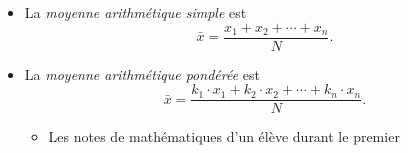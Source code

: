 \begin{defi}
\begin{itemize}
\begin{ex}
\begin{itemize}
{{\[                                                                \]
                                                                On en déduit
                                                                \[
                                                                  x=\frac{b-a}{\beta-\alpha}(y-\alpha)+a.
                                                                \]
                                                                Pour trouver $x_m$, on prend $y=m$ :
                                                                \[
                                                                  \propbox{x_m=\frac{b-a}{\beta-\alpha}(m-\alpha)+a}.
                                                                \]
                                                              }%
                                                            } :
                                                            \[
                                                                  70 + \frac{80 - 70}{1388} \cdot (1918 - 1522)
                                                                   = 72,853\text{ ans}            
                                                            \]
                                                            soit 72 ans 10 mois et 7 jours.%
                                                \end{itemize}
                                          \end{ex}
                                    \item La \emph{moyenne arithm\'etique simple} est 
                                          \[
                                          \bar{x} = \frac{x_1 + x_2 + \cdots + x_n}{N}.
                                          \]
                                    \item La \emph{moyenne arithm\'etique pond\'er\'ee} est 
                                          \[
                                          \bar{x} = \frac{k_1 \cdot x_1 + k_2 \cdot x_2 + \cdots + k_n \cdot x_n}{N}.
                                          \]
                                          \begin{ex}
                                                \begin{itemize}
                                                      \item Les notes de math\'ematiques d'un \'el\`eve durant le premier 

\end{itemize}
\end{ex}
\end{itemize}
\end{defi}
